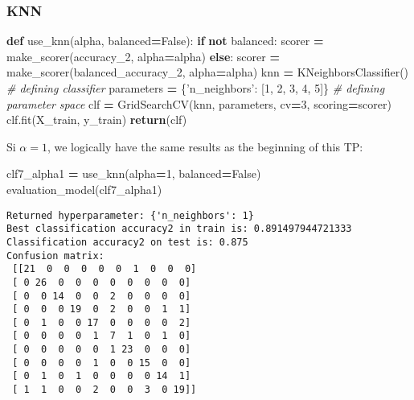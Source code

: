 \documentclass[10pt,a4paper]{article}
\newenvironment{Shaded}{\begin{snugshade}}{\end{snugshade}}
\newcommand{\CommentTok}[1]{\textcolor[rgb]{0.56,0.35,0.01}{\textit{#1}}}
\newcommand{\ControlFlowTok}[1]{\textcolor[rgb]{0.13,0.29,0.53}{\textbf{#1}}}
\newcommand{\DecValTok}[1]{\textcolor[rgb]{0.00,0.00,0.81}{#1}}
\newcommand{\KeywordTok}[1]{\textcolor[rgb]{0.13,0.29,0.53}{\textbf{#1}}}
\newcommand{\NormalTok}[1]{#1}
\newcommand{\OperatorTok}[1]{\textcolor[rgb]{0.81,0.36,0.00}{\textbf{#1}}}
\newcommand{\StringTok}[1]{\textcolor[rgb]{0.31,0.60,0.02}{#1}}
\newcommand{\VariableTok}[1]{\textcolor[rgb]{0.00,0.00,0.00}{#1}}
\theoremstyle{break}
\begin{document}
\hypertarget{knn}{%
\subsubsection{KNN}\label{knn}}

\begin{Shaded}
\begin{Highlighting}[]
\KeywordTok{def}\NormalTok{ use_knn(alpha, balanced}\OperatorTok{=}\VariableTok{False}\NormalTok{):}
    \ControlFlowTok{if} \KeywordTok{not}\NormalTok{ balanced:}
\NormalTok{        scorer }\OperatorTok{=}\NormalTok{ make_scorer(accuracy_2, alpha}\OperatorTok{=}\NormalTok{alpha)}
    \ControlFlowTok{else}\NormalTok{:}
\NormalTok{        scorer }\OperatorTok{=}\NormalTok{ make_scorer(balanced_accuracy_2, alpha}\OperatorTok{=}\NormalTok{alpha)   }
\NormalTok{    knn }\OperatorTok{=}\NormalTok{ KNeighborsClassifier() }\CommentTok{# defining classifier}
\NormalTok{    parameters }\OperatorTok{=}\NormalTok{ \{}\StringTok{'n_neighbors'}\NormalTok{: [}\DecValTok{1}\NormalTok{, }\DecValTok{2}\NormalTok{, }\DecValTok{3}\NormalTok{, }\DecValTok{4}\NormalTok{, }\DecValTok{5}\NormalTok{]\} }\CommentTok{# defining parameter space}
\NormalTok{    clf }\OperatorTok{=}\NormalTok{ GridSearchCV(knn, parameters, cv}\OperatorTok{=}\DecValTok{3}\NormalTok{, scoring}\OperatorTok{=}\NormalTok{scorer)}
\NormalTok{    clf.fit(X_train, y_train)}
    \ControlFlowTok{return}\NormalTok{(clf)}
\end{Highlighting}
\end{Shaded}

Si \(\alpha = 1\), we logically have the same results as the beginning of this TP:

\begin{Shaded}
\begin{Highlighting}[]
\NormalTok{clf7_alpha1 }\OperatorTok{=}\NormalTok{ use_knn(alpha}\OperatorTok{=}\DecValTok{1}\NormalTok{, balanced}\OperatorTok{=}\VariableTok{False}\NormalTok{)}
\NormalTok{evaluation_model(clf7_alpha1)}
\end{Highlighting}
\end{Shaded}

\begin{verbatim}
Returned hyperparameter: {'n_neighbors': 1}
Best classification accuracy2 in train is: 0.891497944721333
Classification accuracy2 on test is: 0.875
Confusion matrix: 
 [[21  0  0  0  0  0  1  0  0  0]
 [ 0 26  0  0  0  0  0  0  0  0]
 [ 0  0 14  0  0  2  0  0  0  0]
 [ 0  0  0 19  0  2  0  0  1  1]
 [ 0  1  0  0 17  0  0  0  0  2]
 [ 0  0  0  0  1  7  1  0  1  0]
 [ 0  0  0  0  0  1 23  0  0  0]
 [ 0  0  0  0  1  0  0 15  0  0]
 [ 0  1  0  1  0  0  0  0 14  1]
 [ 1  1  0  0  2  0  0  3  0 19]]
\end{verbatim}
\end{document}
